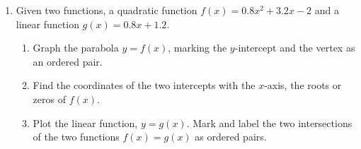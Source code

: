 \documentclass[12pt, twoside]{article}
\begin{document}
\begin{enumerate}
\newpage
\item Given two functions, a quadratic function $f(x)=0.8x^2+3.2x-2$ and a linear function $g(x)=0.8x+1.2$.
    \begin{enumerate}%
        \item Graph the parabola $y=f(x)$, marking the $y$-intercept and the vertex as an ordered pair.
        \item Find the coordinates of the two intercepts with the $x$-axis, the roots or zeros of $f(x)$.\vspace{1cm}
        \item Plot the linear function, $y=g(x)$. Mark and label the two intersections of the two functions $f(x)=g(x)$ as ordered pairs.
    \end{enumerate}
    \begin{center}
    \end{center}

\newpage



\end{enumerate}
\end{document}
